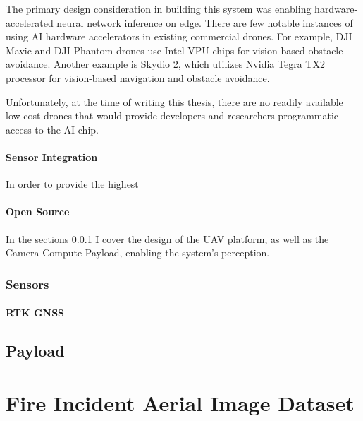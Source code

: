   The primary design consideration in building this system was enabling hardware-accelerated neural network inference on edge.
  There are few notable instances of using AI hardware accelerators in existing commercial drones.
  For example, DJI Mavic and DJI Phantom drones use Intel VPU chips for vision-based obstacle avoidance. 
  Another example is Skydio 2, which utilizes Nvidia Tegra TX2 processor for vision-based navigation and obstacle avoidance.

  Unfortunately, at the time of writing this thesis, there are no readily available low-cost drones that would provide developers and researchers
  programmatic access to the AI chip. 

  \paragraph{Sensor Integration}

  In order to provide the highest 

  \paragraph{Open Source}
  
  In the sections \ref{sec:sensors} I cover the design of the UAV platform, as well as the Camera-Compute Payload, enabling the system's perception.

  
  
  \subsubsection{Sensors}\label{sec:sensors}


  \paragraph{RTK GNSS}


  
  
  \subsection{Payload}\label{sec:hardware:payload}



\section{Fire Incident Aerial Image Dataset}\label{sec:dataset}

